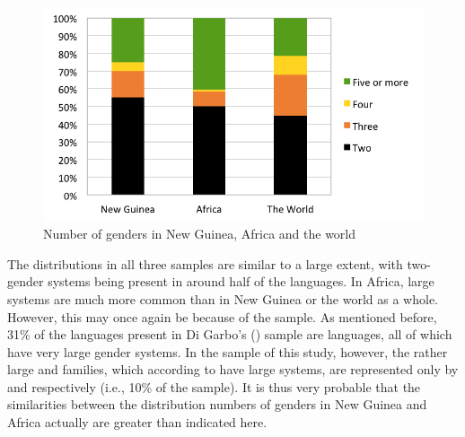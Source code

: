 \documentclass[output=collectionpaper]{langsci/langscibook}
\begin{document}
\begin{figure}
\includegraphics[width=.8\textwidth]{figures/09/fig8.png}
\caption{Number of genders in New Guinea, Africa and the world}
\label{fig:Svard:8}
\end{figure}

The distributions in all three samples are similar to a large extent, with two-gender systems being present in around half of the languages. In Africa, large systems are much more common than in New Guinea or the world as a whole. However, this may once again be because of the sample. As mentioned before, 31\% of the languages present in Di Garbo's (\citeyear{DiGarbo2014}) sample are  languages, all of which have very large gender systems. In the sample of this study, however, the rather large  and  families, which according to \citet[372]{Foley2000} have large systems, are represented only by  and  respectively (i.e., 10\% of the sample). It is thus very probable that the similarities between the distribution numbers of genders in New Guinea and Africa actually are greater than indicated here.
\end{document}
